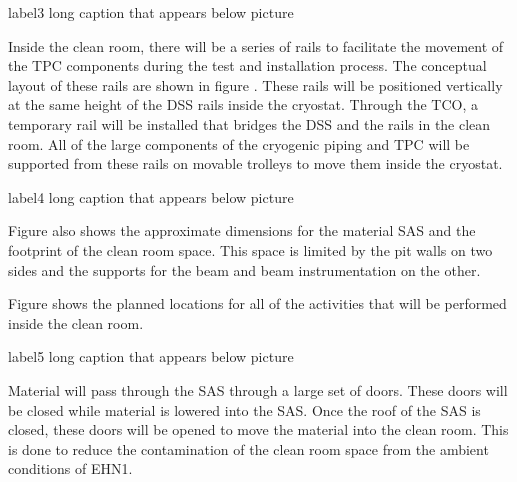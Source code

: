 \begin{cdrfigure}{label}{3 long caption that appears below picture}
\end{cdrfigure}


Inside the clean room, there will be a series of rails to facilitate the movement of the TPC components during the test and installation process.  The conceptual layout of these rails are shown in figure .  These rails will be positioned vertically at the same height of the DSS rails inside the cryostat.  Through the TCO, a temporary rail will be installed that bridges the DSS and the rails in the clean room.  All of the large components of the cryogenic piping and TPC will be supported from these rails on movable trolleys to move them inside the cryostat.  

\begin{cdrfigure}{label}{4 long caption that appears below picture}
\end{cdrfigure}


Figure  also shows the approximate dimensions for the material SAS and the footprint of the clean room space.  This space is limited by the pit walls on two sides and the supports for the beam and beam instrumentation on the other.  

Figure  shows the planned locations for all of the activities that will be performed inside the clean room.  
\begin{cdrfigure}{label}{5 long caption that appears below picture}
\end{cdrfigure}
Material will pass through the SAS through a large set of doors.  These doors will be closed while material is lowered into the SAS.  Once the roof of the SAS is closed, these doors will be opened to move the material into the clean room.  This is done to reduce the contamination of the clean room space from the ambient conditions of EHN1.  

